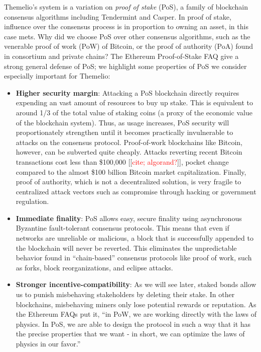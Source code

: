 \documentclass[headinclude]{scrbook}
\newcommand\mytodo[1]{[[\textcolor{red}{#1}]]}
\begin{document}
Themelio's system is a variation on \emph{proof of stake} (PoS), a family of blockchain consensus algorithms including Tendermint and Casper. In proof of stake, influence over the consensus process is in proportion to owning an asset, in this case mets. Why did we choose PoS over other consensus algorithms, such as the venerable proof of work (PoW) of Bitcoin, or the proof of authority (PoA) found in consortium and private chains? The Ethereum Proof-of-Stake FAQ \cite{buterin2019pos} give a strong general defense of PoS; we highlight some properties of PoS we consider especially important for Themelio:

\begin{itemize}
    \item \textbf{Higher security margin}: Attacking a PoS blockchain directly requires expending an vast amount of resources to buy up stake. This is equivalent to around 1/3 of the total value of staking coins (a proxy of the economic value of the blockchain system). Thus, as usage increases, PoS  security will proportionately strengthen until it becomes practically invulnerable to attacks on the consensus protocol. Proof-of-work blockchains like Bitcoin, however, can be subverted quite cheaply. Attacks reverting recent Bitcoin transactions cost less than \$100,000 \mytodo{cite; algorand?}, pocket change compared to the almost \$100 billion Bitcoin market capitalization. Finally, proof of authority, which is not a decentralized solution, is very fragile to centralized attack vectors such as compromise through hacking or government regulation.
    \item \textbf{Immediate finality}: PoS allows easy, secure finality using asynchronous Byzantine fault-tolerant consensus protocols. This means that even if networks are unreliable or malicious, a block that is successfully appended to the blockchain will never be reverted. This eliminates the unpredictable behavior found in ``chain-based'' consensus protocols like proof of work, such as forks, block reorganizations, and eclipse attacks.
    \item \textbf{Stronger incentive-compatibility}: As we will see later, staked bonds allow us to punish misbehaving stakeholders by deleting their stake. In other blockchains, misbehaving miners only lose potential rewards or reputation. As the Ethereum FAQs put it, ``in PoW, we are working directly with the laws of physics. In PoS, we are able to design the protocol in such a way that it has the precise properties that we want - in short, we can optimize the laws of physics in our favor.''
\end{itemize}
\end{document}
